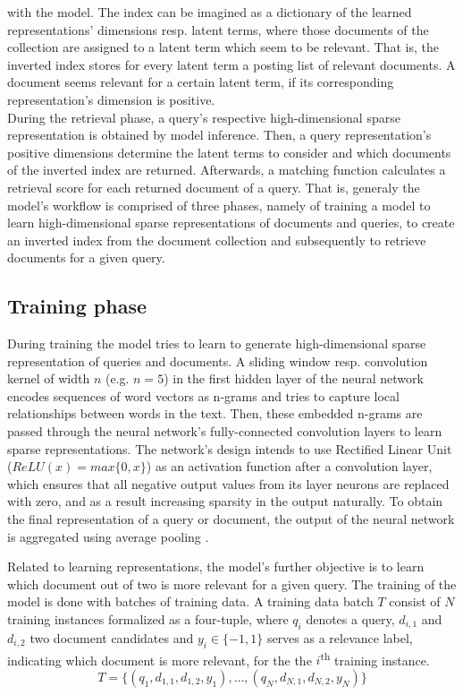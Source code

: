     with the model.
The index can be imagined as a dictionary of 
    the learned representations' dimensions resp. latent terms, 
    where those documents of the collection are assigned to a 
    latent term which seem to be relevant.
That is, the inverted index stores for every latent term a posting list 
    of relevant documents.
A document seems relevant for a certain latent term, if its
    corresponding representation's dimension is positive.\\
During the retrieval phase, a query's respective high-dimensional 
    sparse representation is obtained by model inference.
Then, a query representation's positive dimensions determine
    the latent terms to consider and
    which documents of the inverted index are returned.
Afterwards, a matching function calculates a retrieval score for each
    returned document of a query. 
That is, generaly the model's workflow is comprised of three phases,
    namely of training a model to learn high-dimensional sparse 
    representations of documents and queries,
    to create an inverted index from the document collection
    and subsequently to retrieve documents for a given query.
    \cite{zamani:2018:from-neural-reranking-to-neural-ranking}

\subsection*{Training phase}

During training the model tries to learn to generate high-dimensional 
    sparse representation of queries and documents.
A sliding window resp. convolution kernel of width $n$ (e.g. $n=5$)
    in the first hidden layer of the neural network encodes 
    sequences of word vectors as n-grams and tries to capture local 
    relationships between words in the text.
Then, these embedded n-grams are passed through the neural network's
    fully-connected convolution layers to learn sparse representations.
The network's design intends to use Rectified Linear Unit 
    ($ReLU(x)=max\{0,x\}$) as an activation function after a convolution
    layer, which ensures that all negative output values from its layer 
    neurons are replaced with zero, and as a result increasing
    sparsity in the output naturally.
To obtain the final representation of a query or document,
    the output of the neural network is aggregated using average pooling
    \cite{zamani:2018:from-neural-reranking-to-neural-ranking}.

Related to learning representations, the model's further objective is
    to learn which document out of two is more relevant for a given query.
The training of the model is done with batches of training data.
A training data batch $T$ consist of $N$ training instances
    formalized as a four-tuple, where
    $q_i$ denotes a query, 
    $d_{i,1}$ and $d_{i,2}$ two document candidates and
    $y_i \in \{-1,1\}$ serves as a relevance label, indicating which document
    is more relevant, for the the $i$\textsuperscript{th} training instance.
\[
T=\{ (q_1,d_{1,1},d_{1,2},y_1), \ldots, (q_N,d_{N,1},d_{N,2},y_N)\}
\]

